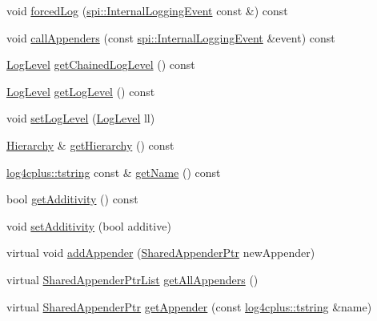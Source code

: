 \begin{DoxyCompactItemize}
\item 
void \hyperlink{classlog4cplus_1_1Logger_a8f5e72d12d6870790af52ce0ab26bc19}{forced\-Log} (\hyperlink{classlog4cplus_1_1spi_1_1InternalLoggingEvent}{spi\-::\-Internal\-Logging\-Event} const \&) const 
\item 
void \hyperlink{classlog4cplus_1_1Logger_a3fe6a538649a5f19cbce148817e06c68}{call\-Appenders} (const \hyperlink{classlog4cplus_1_1spi_1_1InternalLoggingEvent}{spi\-::\-Internal\-Logging\-Event} \&event) const 
\item 
\hyperlink{namespacelog4cplus_abd332cc8c98fefcbbdcf57b6b3867de9}{Log\-Level} \hyperlink{classlog4cplus_1_1Logger_a1ddc3528a5226a899f9d43b8509a857b}{get\-Chained\-Log\-Level} () const 
\item 
\hyperlink{namespacelog4cplus_abd332cc8c98fefcbbdcf57b6b3867de9}{Log\-Level} \hyperlink{classlog4cplus_1_1Logger_a3ca6be431ab50bbfd48e9adf34a7f311}{get\-Log\-Level} () const 
\item 
void \hyperlink{classlog4cplus_1_1Logger_ac83b8006bcb44874eb2003b3757a7fdb}{set\-Log\-Level} (\hyperlink{namespacelog4cplus_abd332cc8c98fefcbbdcf57b6b3867de9}{Log\-Level} ll)
\item 
\hyperlink{classlog4cplus_1_1Hierarchy}{Hierarchy} \& \hyperlink{classlog4cplus_1_1Logger_aacb40fb76173b5e94b7840a64dda1020}{get\-Hierarchy} () const 
\item 
\hyperlink{namespacelog4cplus_a3c9287f6ebcddc50355e29d71152117b}{log4cplus\-::tstring} const \& \hyperlink{classlog4cplus_1_1Logger_a6d2ad74e4e859415948504e6dcb86d98}{get\-Name} () const 
\item 
bool \hyperlink{classlog4cplus_1_1Logger_afe9f2d68f3888be512ed4198c388450e}{get\-Additivity} () const 
\item 
void \hyperlink{classlog4cplus_1_1Logger_a394c7f62c138153dac080e076816dd49}{set\-Additivity} (bool additive)
\item 
virtual void \hyperlink{classlog4cplus_1_1Logger_a9047519e616ba5e7c4e90ff5beb88b08}{add\-Appender} (\hyperlink{namespacelog4cplus_a12d841b842c72396be9219ce67a0c215}{Shared\-Appender\-Ptr} new\-Appender)
\item 
virtual \hyperlink{namespacelog4cplus_a97158ac12736f649c5477d7b63f51ede}{Shared\-Appender\-Ptr\-List} \hyperlink{classlog4cplus_1_1Logger_aef0ac32111fdff439d6ae08ee3d27701}{get\-All\-Appenders} ()
\item 
virtual \hyperlink{namespacelog4cplus_a12d841b842c72396be9219ce67a0c215}{Shared\-Appender\-Ptr} \hyperlink{classlog4cplus_1_1Logger_a7fd4a9b9f904cefad2d973c83a514035}{get\-Appender} (const \hyperlink{namespacelog4cplus_a3c9287f6ebcddc50355e29d71152117b}{log4cplus\-::tstring} \&name)

\end{DoxyCompactItemize}
